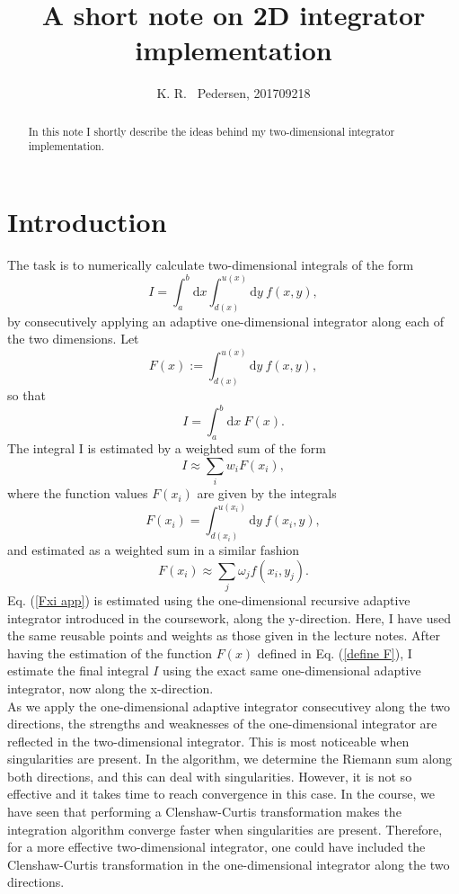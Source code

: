 \documentclass{article}
\title{A short note on 2D integrator implementation}
\author{K. R. ~Pedersen, 201709218}
\date{}
\begin{document}
\lstset{language=C}
\maketitle

\begin{abstract}
In this note I shortly describe the ideas behind my two-dimensional integrator implementation.
\end{abstract}

\section{Introduction}
The task is to numerically calculate two-dimensional integrals of the form
\begin{equation}
	I = \int_a^b {\mathrm d x} \int_{d(x)}^{u(x)} {\mathrm d y} \: f(x,y),
	\label{integral}
\end{equation}
by consecutively applying an adaptive one-dimensional integrator along each of the two dimensions. Let
\begin{equation}
	F(x):= \int_{d(x)}^{u(x)} {\mathrm d y} \: f(x,y),
	\label{define F}
\end{equation}
so that
\begin{equation}
	I=\int_a^b {\mathrm d x} \: F(x).
	\label{I short}
\end{equation}
The integral I is estimated by a weighted sum of the form
\begin{equation}
	I \approx \sum_i w_iF(x_i),
	\label{I app}
\end{equation}
where the function values $F(x_i)$ are given by the integrals
\begin{equation}
	F(x_i) = \int_{d(x_i)}^{u(x_i)} {\mathrm d y} \: f(x_i, y),
	\label{Fxi def}
\end{equation}
and estimated as a weighted sum in a similar fashion
\begin{equation}
	F(x_i) \approx \sum_j \omega_j f(x_i, y_j).
	\label{Fxi app}
\end{equation}
Eq. (\ref{Fxi app}) is estimated using the one-dimensional recursive adaptive integrator introduced in the coursework, along the y-direction. Here, I have used the same reusable points and weights as those given in the lecture notes. After having the estimation of the function $F(x)$ defined in Eq. (\ref{define F}), I estimate the final integral $I$ using the exact same one-dimensional adaptive integrator, now along the x-direction.\\ 
As we apply the one-dimensional adaptive integrator consecutivey along the two directions, the strengths and weaknesses of the one-dimensional integrator are reflected in the two-dimensional integrator. This is most noticeable when singularities are present. In the algorithm, we determine the Riemann sum along both directions, and this can deal with singularities. However, it is not so effective and it takes time to reach convergence in this case. In the course, we have seen that performing a Clenshaw-Curtis transformation makes the integration algorithm converge faster when singularities are present. Therefore, for a more effective two-dimensional integrator, one could have included the Clenshaw-Curtis transformation in the one-dimensional integrator along the two directions. 
\end{document}
